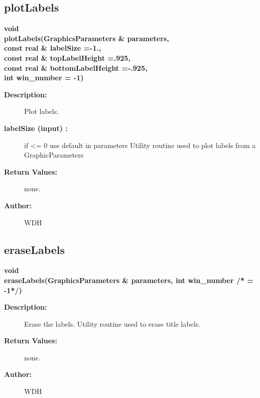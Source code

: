 \subsection{plotLabels}
 
\begin{flushleft} \textbf{%
void  \\ 
\settowidth{\GLGraphicsInterfaceIncludeArgIndent}{plotLabels(}%
plotLabels(GraphicsParameters \& parameters,\\ 
\hspace{\GLGraphicsInterfaceIncludeArgIndent}const real \& labelSize  =-1.,\\ 
\hspace{\GLGraphicsInterfaceIncludeArgIndent}const real \& topLabelHeight  =.925,\\ 
\hspace{\GLGraphicsInterfaceIncludeArgIndent}const real \& bottomLabelHeight  =-.925,\\ 
\hspace{\GLGraphicsInterfaceIncludeArgIndent}int win\_number  = -1)
}\end{flushleft}
\begin{description}
\item[{\bf Description:}] 
    Plot labels.
\item[{\bf labelSize (input) :}]  if <= 0 use default in parameters
 Utility routine used to plot labels from a GraphicParameters 
\item[{\bf Return Values:}]  none.
  
\item[{\bf Author:}]  WDH
\end{description}
\subsection{eraseLabels}
 
\begin{flushleft} \textbf{%
void  \\ 
\settowidth{\GLGraphicsInterfaceIncludeArgIndent}{eraseLabels(}%
eraseLabels(GraphicsParameters \& parameters, int win\_number /* = -1*/)
}\end{flushleft}
\begin{description}
\item[{\bf Description:}] 
    Erase the labels.
    Utility routine used to erase title labels.
\item[{\bf Return Values:}]  none.
  
\item[{\bf Author:}]  WDH
\end{description}

